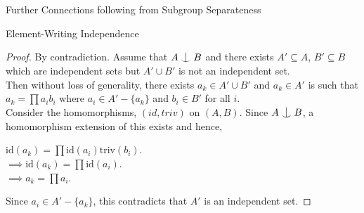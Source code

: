 \documentclass{article}
\def\indep{\mathrel{\raise0.2ex\hbox{\ooalign{\hidewidth$\vert$\hidewidth\cr\raise-0.9ex\hbox{$\smile$}}}}}
\begin{document}
\begin{section}{Further Connections following from Subgroup Separateness}
\begin{subsection}{Element-Writing Independence}
			
			\begin{proof}
				By contradiction. Assume that $A \indep B$ and  there exists $A' \subseteq A$, $B' \subseteq B$  which are independent sets but   $A' \cup B'$ is not an independent set.\\
				
				Then without loss of generality, there exists $a_k \in A' \cup B'$ and $a_k \in A'$ is such that  $a_k = \prod a_ib_i$ where $a_i \in A' - \{a_k\}$ and $b_i \in B'$ for all $i$. \\
				
				Consider the homomorphisms, $(id, triv)$ on $(A, B)$. Since $A \indep B$, a homomorphism extension of this exists and hence,
				
				$\text{id}(a_k) = \prod\text{id}(a_i)\text{triv}(b_i)$.\\
				$\implies\text{id}(a_k) = \prod \text{id}(a_i)$.\\
				$\implies a_k = \prod a_i$.
				
				Since $a_i \in A' - \{a_k\}$, this contradicts that $A'$ is an independent set.
			\end{proof}
			
			
			
		\end{subsection}
		
	\end{section}
	
\end{document}
